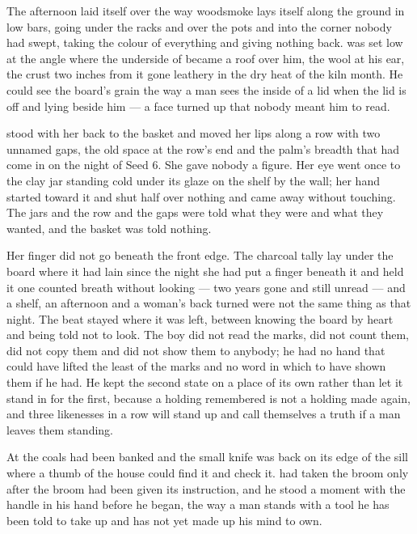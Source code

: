 The afternoon laid itself over  the way woodsmoke lays itself along the ground in low bars, going under the racks and over the pots and into the corner nobody had swept, taking the colour of everything and giving nothing back.  was set low at the angle where the underside of  became a roof over him, the wool at his ear, the crust two inches from it gone leathery in the dry heat of the kiln month. He could see the board's grain the way a man sees the inside of a lid when the lid is off and lying beside him --- a face turned up that nobody meant him to read.

 stood with her back to the basket and moved her lips along a row with two unnamed gaps, the old space at the row's end and the palm's breadth that had come in on the night of Seed 6. She gave nobody a figure. Her eye went once to the clay jar standing cold under its glaze on the shelf by the wall; her hand started toward it and shut half over nothing and came away without touching. The jars and the row and the gaps were told what they were and what they wanted, and the basket was told nothing.

Her finger did not go beneath the front edge. The charcoal tally lay under the board where it had lain since the night she had put a finger beneath it and held it one counted breath without looking --- two years gone and still unread --- and a shelf, an afternoon and a woman's back turned were not the same thing as that night. The beat stayed where it was left, between knowing the board by heart and being told not to look. The boy did not read the marks, did not count them, did not copy them and did not show them to anybody; he had no hand that could have lifted the least of the marks and no word in which to have shown them if he had. He kept the second state on a place of its own rather than let it stand in for the first, because a holding remembered is not a holding made again, and three likenesses in a row will stand up and call themselves a truth if a man leaves them standing.

\scenebreak

At  the coals had been banked and the small knife was back on its edge of the sill where a thumb of the house could find it and check it.  had taken the broom only after the broom had been given its instruction, and he stood a moment with the handle in his hand before he began, the way a man stands with a tool he has been told to take up and has not yet made up his mind to own.

